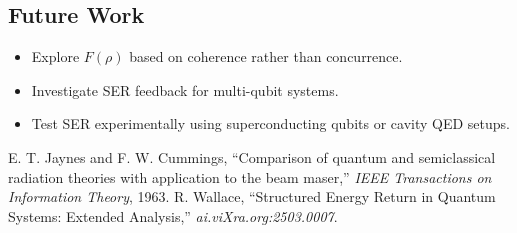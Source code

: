 \documentclass[12pt]{article}
\begin{document}
\subsection{Future Work}
\begin{itemize}
    \item Explore $F(\rho)$ based on coherence rather than concurrence.
    \item Investigate SER feedback for multi-qubit systems.
    \item Test SER experimentally using superconducting qubits or cavity QED setups.
\end{itemize}

\begin{thebibliography}{9}
 E. T. Jaynes and F. W. Cummings, ``Comparison of quantum and semiclassical radiation theories with application to the beam maser,'' \textit{IEEE Transactions on Information Theory}, 1963.
 R. Wallace, ``Structured Energy Return in Quantum Systems: Extended Analysis,'' \textit{ai.viXra.org:2503.0007}.
\end{thebibliography}
\end{document}
